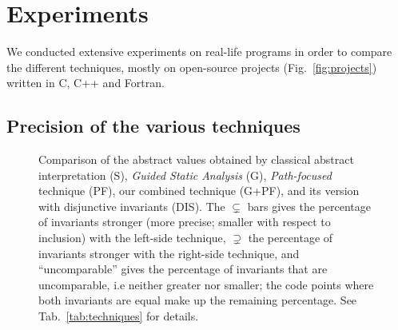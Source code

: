 \documentclass{entcs}
\begin{document}
\section{Experiments}
\label{sec:experiments}

We conducted extensive experiments on real-life programs in order to compare the
different techniques, mostly on open-source projects (Fig.~\ref{fig:projects}) written in C, C++ and Fortran.

\subsection{Precision of the various techniques}
\label{sec:compare_techniques}

\begin{figure}[h]
  \begin{center}
    
  \end{center} 
  \vspace{-20pt}
  \caption{Comparison of the abstract values obtained by classical abstract
  interpretation (S), \emph{Guided Static
  Analysis} (G), \emph{Path-focused} technique (PF), our combined technique
  (G+PF), and its version with disjunctive invariants (DIS).
  The $\subsetneq$ bars gives the percentage of invariants stronger (more precise; smaller with respect to inclusion) with the left-side technique,
$\supsetneq$ the percentage of invariants stronger with the right-side technique,
and ``uncomparable'' gives the percentage of invariants that are uncomparable, i.e
neither greater nor smaller;
the code points where both invariants are equal make up the remaining percentage. See Tab.~\ref{tab:techniques} for details.}
  \label{fig:techniques}
\end {figure}
\end{document}
